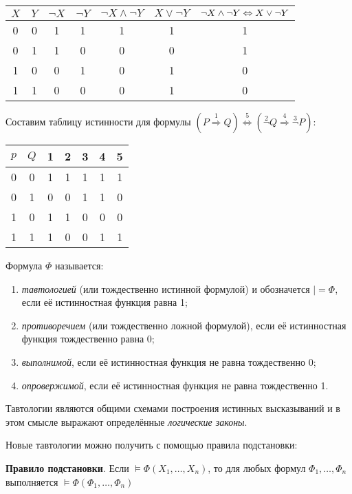 \begin{tabular}{|ccccccc|}
    \hline
    $X$ & $Y$ & $\lnot X$ & $\lnot Y$ & $\lnot X \land \lnot Y$ & $X \lor \lnot Y$ & $\lnot X \land \lnot Y \Leftrightarrow X \lor \lnot Y$ \\
    \hline
    0 & 0 & 1 & 1 & 1 & 1 & 1 \\
    0 & 1 & 1 & 0 & 0 & 0 & 1 \\
    1 & 0 & 0 & 1 & 0 & 1 & 0 \\
    1 & 1 & 0 & 0 & 0 & 1 & 0 \\
    \hline
\end{tabular}

\ex Составим таблицу истинности для формулы $(P \overset 1 \Rightarrow Q) \overset 5 \Leftrightarrow (\overset 2 \lnot Q \overset 4 \Rightarrow \overset 3 \lnot P)$:

\begin{tabular}{|ccccccc|}
    \hline
    $p$ & $Q$ & 1 & 2 & 3 & 4 & 5 \\
    \hline
    0 & 0 & 1 & 1 & 1 & 1 & 1 \\
    0 & 1 & 0 & 0 & 1 & 1 & 0 \\
    1 & 0 & 1 & 1 & 0 & 0 & 0 \\
    1 & 1 & 1 & 0 & 0 & 1 & 1 \\
    \hline
\end{tabular}

\dftion Формула $\Phi$ называется:
\begin{enumerate}
    \item \textit{тавтологией} (или тождественно истинной формулой) и обозначется $|= \Phi$, если её истинностная функция равна 1;
    \item \textit{противоречием} (или тождественно ложной формулой), если её истинностная функция тождественно равна 0;
    \item \textit{выполнимой}, если её истинностная функция не равна тождественно 0;
    \item \textit{опровержимой}, если её истинностная функция не равна тождественно 1.
\end{enumerate}

\dftion Тавтологии являются общими схемами построения истинных высказываний и в этом смысле выражают определённые \textit{логические законы}.

Новые тавтологии можно получить с помощью правила подстановки:

\textbf{Правило подстановки}. Если $\vDash \Phi(X_1, \dots, X_n)$, то для любых формул $\Phi_1, \dots, \Phi_n$ выполняется $\vDash \Phi(\Phi_1, \dots, \Phi_n)$

